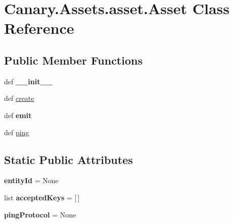 \hypertarget{class_canary_8_assets_1_1asset_1_1_asset}{\section{Canary.\-Assets.\-asset.\-Asset Class Reference}
\label{class_canary_8_assets_1_1asset_1_1_asset}
}
\subsection*{Public Member Functions}
\begin{DoxyCompactItemize}
\item 
\hypertarget{class_canary_8_assets_1_1asset_1_1_asset_abc7738f2bc18a0e4c48629bdb9989fab}{def {\bfseries \-\_\-\-\_\-init\-\_\-\-\_\-}}\label{class_canary_8_assets_1_1asset_1_1_asset_abc7738f2bc18a0e4c48629bdb9989fab}

\item 
def \hyperlink{class_canary_8_assets_1_1asset_1_1_asset_a4474f182b29e0c6da63fef84a3ba2531}{create}
\item 
\hypertarget{class_canary_8_assets_1_1asset_1_1_asset_ac7f7e00a453da8e362726fdd72adb73a}{def {\bfseries emit}}\label{class_canary_8_assets_1_1asset_1_1_asset_ac7f7e00a453da8e362726fdd72adb73a}

\item 
def \hyperlink{class_canary_8_assets_1_1asset_1_1_asset_a78ad62cc1df646fde502db2e6818fa36}{ping}
\end{DoxyCompactItemize}
\subsection*{Static Public Attributes}
\begin{DoxyCompactItemize}
\item 
\hypertarget{class_canary_8_assets_1_1asset_1_1_asset_a11f023bd717868eac08a1c25d627b8c6}{{\bfseries entity\-Id} = None}\label{class_canary_8_assets_1_1asset_1_1_asset_a11f023bd717868eac08a1c25d627b8c6}

\item 
\hypertarget{class_canary_8_assets_1_1asset_1_1_asset_a144bced2259c098e5e20c9b4581fbdbd}{list {\bfseries accepted\-Keys} = \mbox{[}$\,$\mbox{]}}\label{class_canary_8_assets_1_1asset_1_1_asset_a144bced2259c098e5e20c9b4581fbdbd}

\item 
\hypertarget{class_canary_8_assets_1_1asset_1_1_asset_aeaba22f4a649da440842f3e04bd080c6}{{\bfseries ping\-Protocol} = None}\label{class_canary_8_assets_1_1asset_1_1_asset_aeaba22f4a649da440842f3e04bd080c6}

\end{DoxyCompactItemize}


